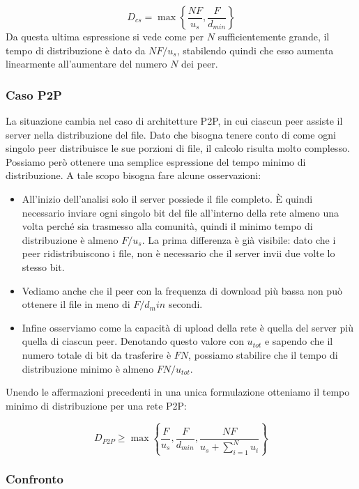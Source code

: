 \[D_{cs} = \max \left\lbrace \frac{NF}{u_s}, \frac{F}{d_{min}} \right\rbrace\]
 Da questa ultima espressione si vede come per $N$ sufficientemente grande, il tempo di distribuzione è dato da $NF/u_s$, stabilendo quindi che esso aumenta linearmente all'aumentare del numero $N$ dei peer.

\subsubsection{Caso P2P}\label{caso-p2p}

La situazione cambia nel caso di architetture P2P, in cui ciascun peer assiste il server nella distribuzione del file. Dato che bisogna tenere conto di come ogni singolo peer distribuisce le sue porzioni di file, il calcolo risulta molto complesso. Possiamo però ottenere una semplice espressione del tempo minimo di distribuzione. A tale scopo bisogna fare alcune osservazioni:

\begin{itemize}
\item
  All'inizio dell'analisi solo il server possiede il file completo. È   quindi necessario inviare ogni singolo bit del file all'interno della   rete almeno una volta perché sia trasmesso alla comunità, quindi il   minimo tempo di distribuzione è almeno $F/u_s$. La prima differenza è   già visibile: dato che i peer ridistribuiscono i file, non è   necessario che il server invii due volte lo stesso bit.
\item
  Vediamo anche che il peer con la frequenza di download più bassa non   può ottenere il file in meno di $F/d_min$ secondi.
\item
  Infine osserviamo come la capacità di upload della rete è quella del   server più quella di ciascun peer. Denotando questo valore con   $u_{tot}$ e sapendo che il numero totale di bit da trasferire è $FN$,   possiamo stabilire che il tempo di distribuzione minimo è almeno   $FN/u_{tot}$.
\end{itemize}

Unendo le affermazioni precedenti in una unica formulazione otteniamo il tempo minimo di distribuzione per una rete P2P:

\[ D_{P2P} \geq \max \left\lbrace \frac{F}{u_s}, \frac{F}{d_{min}}, \frac{NF}{u_s + \sum_{i = 1}^N u_i} \right\rbrace \]

\subsubsection{Confronto}\label{confronto}

